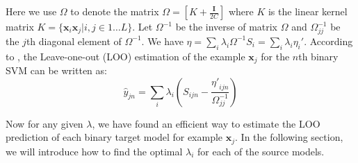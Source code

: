 Here we use $\Omega$ to denote the matrix $\Omega=[K+\frac{\mathbf{I}}{2C}]$ where $K$ is the linear kernel matrix $K=\{\textbf{x}_i\textbf{x}_j|i,j\in 1\dots L\}$. Let
$\Omega^{-1}$ be the inverse of matrix $\Omega$ and $\Omega^{-1}_{jj}$ be the $j$th diagonal element of $\Omega^{-1}$. We have $\eta = \sum_i\lambda_i\Omega^{-1}S_i=\sum_i\lambda_i\eta_i'$. 
According to  \cite{cawley2006leave}, the Leave-one-out (LOO) estimation of the example $\textbf{x}_j$ for the $n$th binary SVM can be written as:
\begin{equation}\label{eq:yhat}
\hat{y}_{jn} = \sum_i\lambda_i\left(S_{ijn}-\frac{{\eta'}_{ijn}}{\Omega_{jj}^{-1}}\right)
\end{equation}

Now for any given $\lambda$, we have found an efficient way to estimate the LOO prediction of each binary target model for example $\textbf{x}_j$. In the following section, we will introduce how to find the optimal $\lambda_i$ for each of the source models. 
